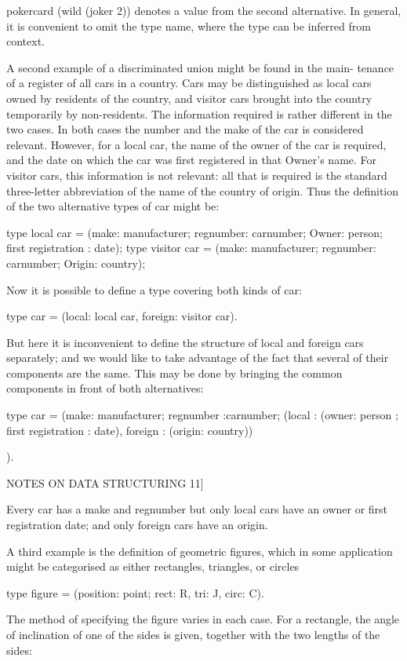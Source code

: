 {	pokercard (wild (joker 2)) denotes a value from the second alternative. In general, it is convenient to omit the type name, where the type can be inferred from context.
	
	A second example of a discriminated union might be found in the main- tenance of a register of all cars in a country. Cars may be distinguished as local cars owned by residents of the country, and visitor cars brought into the country temporarily by non-residents. The information required is rather different in the two cases. In both cases the number and the make of the car is considered relevant. However, for a local car, the name of the owner of the car is required, and the date on which the car was first registered in that Owner’s name. For visitor cars, this information is not relevant: all that is required is the standard three-letter abbreviation of the name of the country of origin. Thus the definition of the two alternative types of car might be:
	
	type local car = (make: manufacturer; regnumber: carnumber; Owner: person; first registration : date); type visitor car = (make: manufacturer; regnumber: carnumber; Origin: country);
	
	Now it is possible to define a type covering both kinds of car:
	
	type car = (local: local car, foreign: visitor car).
	
	But here it is inconvenient to define the structure of local and foreign cars separately; and we would like to take advantage of the fact that several of their components are the same. This may be done by bringing the common components in front of both alternatives:
	
	type car = (make: manufacturer; regnumber :carnumber; (local : (owner: person ; first registration : date), foreign : (origin: country))
	
	).
	
	NOTES ON DATA STRUCTURING 11]
	
	Every car has a make and regnumber but only local cars have an owner or first registration date; and only foreign cars have an origin.
	
	A third example is the definition of geometric figures, which in some application might be categorised as either rectangles, triangles, or circles
	
	type figure = (position: point; rect: R, tri: J, circ: C).
	
	The method of specifying the figure varies in each case. For a rectangle, the angle of inclination of one of the sides is given, together with the two lengths of the sides:
	
}
